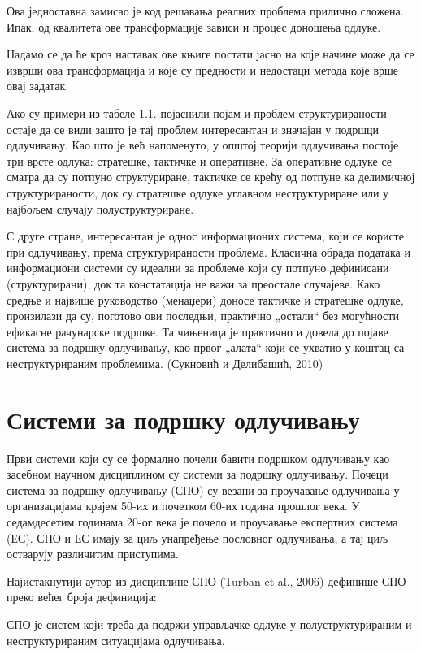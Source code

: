 Ова једноставна замисао је код решавања реалних проблема прилично сложена. Ипак, од квалитета ове трансформације зависи и процес доношења одлуке.

Надамо се да ће кроз наставак ове књиге постати јасно на које начине може да се изврши ова трансформација и које су предности и недостаци метода које врше овај задатак.

Ако су примери из табеле 1.1. појаснили појам и проблем структурираности остаје да се види зашто је тај проблем интересантан и значајан у подршци одлучивању. Као што је већ напоменуто, у општој теорији одлучивања постоје три врсте одлука: стратешке, тактичке и оперативне. За оперативне одлуке се сматра да су потпуно структуриране, тактичке се крећу од потпуне ка делимичној структурираности, док су стратешке одлуке углавном неструктуриране или у најбољем случају полуструктуриране.

С друге стране, интересантан је однос информационих система, који се користе при одлучивању, према структурираности проблема. Класична обрада података и информациони системи су идеални за проблеме који су потпуно дефинисани (структурирани), док та констатација не важи за преостале случајеве. Како средње и највише руководство (менаџери) доносе тактичке и стратешке одлуке, произилази да су, поготово ови последњи, практично „остали“ без могућности ефикасне рачунарске подршке. Та чињеница је практично и довела до појаве система за подршку одлучивању, као првог „алата“ који се ухватио у коштац са неструктурираним проблемима. (Сукновић и Делибашић, 2010)

\section{Системи за подршку одлучивању}
Први системи који су се формално почели бавити подршком одлучивању као засебном научном дисциплином су системи за подршку одлучивању. Почеци система за подршку одлучивању (СПО) су везани за проучавање одлучивања у организацијама крајем 50-их и почетком 60-их година прошлог века. У седамдесетим годинама 20-ог века је почело и проучавање експертних система (ЕС). СПО и ЕС имају за циљ унапређење пословног одлучивања, а тај циљ остварују различитим приступима.

Најистакнутији аутор из дисциплине СПО (Turban et al., 2006) дефинише СПО преко већег броја дефиниција:

СПО је систем који треба да подржи управљачке одлуке у полуструктурираним и неструктурираним ситуацијама одлучивања.

